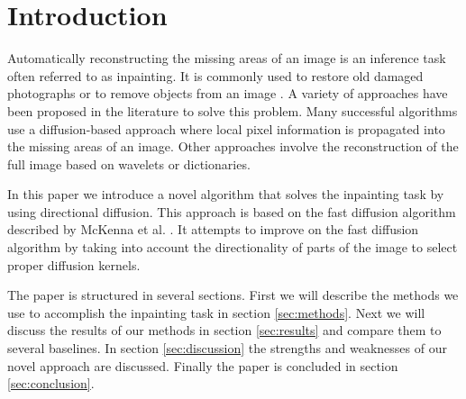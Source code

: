 \section{Introduction}
\label{sec:introduction}

Automatically reconstructing the missing areas of an image is an inference task often referred to as inpainting. It is commonly used to restore old damaged photographs or to remove objects from an image \cite{bertalmio2000image}. A variety of approaches have been proposed in the literature to solve this problem. Many successful algorithms use a diffusion-based approach where local pixel information is propagated into the missing areas of an image. Other approaches involve the reconstruction of the full image based on wavelets or dictionaries.

In this paper we introduce a novel algorithm that solves the inpainting task by using  directional diffusion. This approach is based on the fast diffusion algorithm described by McKenna et al. \cite{richard2001fast}. It attempts to improve on the fast diffusion algorithm by taking into account the directionality of parts of the image to select proper diffusion kernels.

The paper is structured in several sections. First we will describe the methods we use to accomplish the inpainting task in section \ref{sec:methods}. Next we will discuss the results of our methods in section \ref{sec:results} and compare them to several baselines. In section \ref{sec:discussion} the strengths and weaknesses of our novel approach are discussed. Finally the paper is concluded in section \ref{sec:conclusion}.
